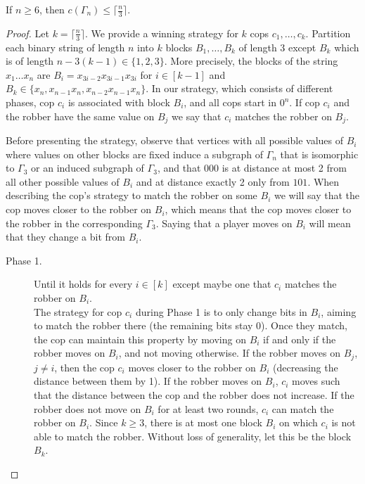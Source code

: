 \documentclass[10pt,a4paper]{amsart}
\begin{document}
\begin{theorem}
    \label{thm:n/3}
    If $n \geq 6$, then $c(\Gamma_n)\leq \lceil \frac{n}{3}\rceil$.
\end{theorem}

\begin{proof}
    Let $k=\lceil \frac{n}{3}\rceil$. We provide a winning strategy for $k$ cops $c_1, \ldots, c_k$. Partition each binary string of length $n$ into $k$ blocks $B_1, \ldots, B_k$ of length 3 except $B_k$ which is of length $n - 3(k-1) \in \{1,2,3\}$. More precisely, the blocks of the string $x_1 \ldots x_n$ are $B_i = x_{3i-2} x_{3i-1} x_{3i}$ for $i \in [k-1]$ and $B_k \in \{x_n, x_{n-1} x_n, x_{n-2} x_{n-1} x_n\}$. In our strategy, which consists of different phases, cop $c_i$ is associated with block $B_i$, and all cops start in $0^n$. If cop $c_i$ and the robber have the same value on $B_j$ we say that $c_i$ matches the robber on $B_j$.

    Before presenting the strategy, observe that vertices with all possible values of $B_i$ where values on other blocks are fixed induce a subgraph of $\Gamma_n$ that is isomorphic to $\Gamma_3$ or an induced subgraph of $\Gamma_3$, and that $000$ is at distance at most 2 from all other possible values of $B_i$ and at distance exactly 2 only from $101$. When describing the cop's strategy to match the robber on some $B_i$ we will say that the cop moves closer to the robber on $B_i$, which means that the cop moves closer to the robber in the corresponding $\Gamma_3$. Saying that a player moves on $B_i$ will mean that they change a bit from $B_i$.

    \begin{description}
        \item[Phase 1.] Until it holds for every $i \in [k]$ except maybe one that $c_i$ matches the robber on $B_i$.\\
        The strategy for cop $c_i$ during Phase 1 is to only change bits in $B_i$, aiming to match the robber there (the remaining bits stay $0$). Once they match, the cop can maintain this property by moving on $B_i$ if and only if the robber moves on $B_i$, and not moving otherwise. If the robber moves on $B_j$, $j \neq i$, then the cop $c_i$ moves closer to the robber on $B_i$ (decreasing the distance between them by 1). If the robber moves on $B_i$, $c_i$ moves such that the distance between the cop and the robber does not increase. If the robber does not move on $B_i$ for at least two rounds, $c_i$ can match the robber on $B_i$. Since $k \geq 3$, there is at most one block $B_i$ on which $c_i$ is not able to match the robber. Without loss of generality, let this be the block $B_k$.


\end{description}
\end{proof}
\end{document}
